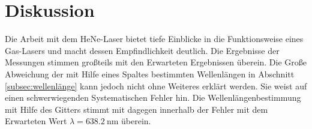 \section{Diskussion}
\label{sec:diskussion}
Die Arbeit mit dem HeNe-Laser bietet tiefe Einblicke in die Funktionsweise
eines Gas-Lasers und macht dessen Empfindlichkeit deutlich.
Die Ergebnisse der Messungen stimmen großteils mit den Erwarteten Ergebnissen
überein.
Die Große Abweichung der mit Hilfe eines Spaltes bestimmten Wellenlängen
in Abschnitt \ref{subsec:wellenlänge} kann jedoch nicht ohne Weiteres
erklärt werden. Sie weist auf einen schwerwiegenden Systematischen Fehler hin.
Die Wellenlängenbestimmung mit Hilfe des Gitters stimmt mit
 dagegen innerhalb der Fehler mit
dem Erwarteten Wert $\lambda = \SI{638.2}{\nano\meter}$ überein.
